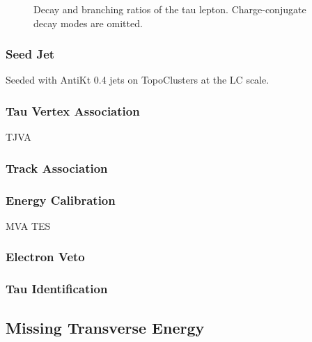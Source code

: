 \begin{figure}[htb]
\begin{subfigure}[b]{0.47\textwidth}
    \subcaption{}%
    \label{fig:tau_branching_ratios}
  \end{subfigure}
  \caption{Decay and branching ratios of the tau
    lepton. Charge-conjugate decay modes are omitted.}
\end{figure}


\subsubsection{Seed Jet}

Seeded with AntiKt 0.4 jets on TopoClusters at the LC scale.

\subsubsection{Tau Vertex Association}

TJVA

\subsubsection{Track Association}

\cite{duschinger}


\subsubsection{Energy Calibration}

MVA TES

\subsubsection{Electron Veto}
\subsubsection{Tau Identification}

\subsection{Missing Transverse Energy}%
\label{sec:atlas_met}


